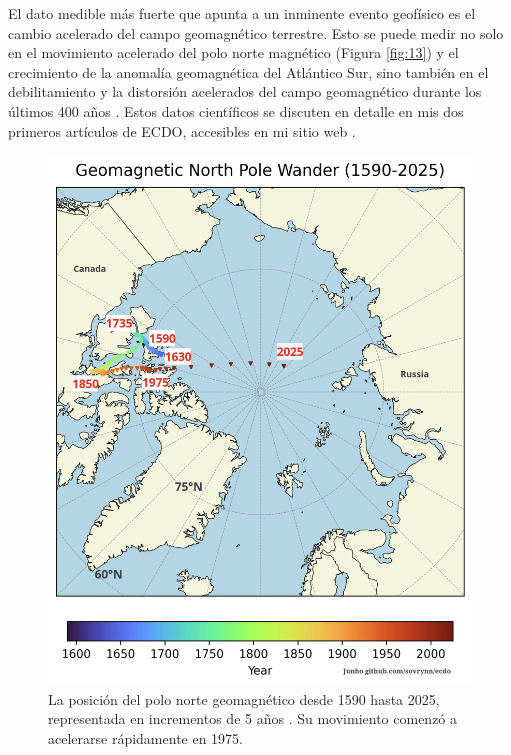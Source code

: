 \documentclass[10pt,twocolumn,letterpaper]{article}
\begin{document}
El dato medible más fuerte que apunta a un inminente evento geofísico es el cambio acelerado del campo geomagnético terrestre. Esto se puede medir no solo en el movimiento acelerado del polo norte magnético (Figura \ref{fig:13}) y el crecimiento de la anomalía geomagnética del Atlántico Sur, sino también en el debilitamiento y la distorsión acelerados del campo geomagnético durante los últimos 400 años \cite{3}. Estos datos científicos se discuten en detalle en mis dos primeros artículos de ECDO, accesibles en mi sitio web \cite{3}.

\begin{figure}[t]

\begin{center}
   \includegraphics[width=1\linewidth]{npw.jpg}
\end{center}
   \caption{La posición del polo norte geomagnético desde 1590 hasta 2025, representada en incrementos de 5 años \cite{41}. Su movimiento comenzó a acelerarse rápidamente en 1975.}
\label{fig:13}
\label{fig:onecol}
\end{figure}
\end{document}
